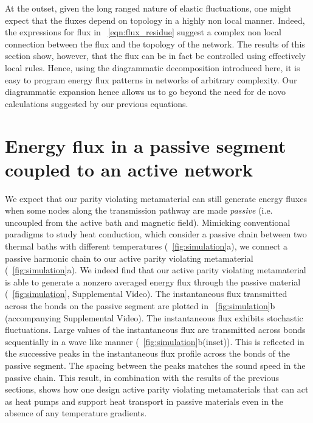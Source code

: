 \documentclass[
 preprint,
 preprintnumbers,
 amsmath,amssymb,
 aps,
 pre,
 longbibliography,
 superscriptaddress,
 10pt, twocolumn
]{revtex4-1}
\begin{document}
At the outset, given the long ranged nature of elastic fluctuations, one might expect that the fluxes depend on topology in a highly non local manner. Indeed, the expressions for flux in \eqnname~\ref{eqn:flux_residue} suggest a complex non local connection between the flux and the topology of the network. The results of this section show, however, that the flux can be in fact be controlled using effectively local rules. Hence, using the diagrammatic decomposition introduced here, it is easy to program energy flux patterns in networks of arbitrary complexity. Our diagrammatic expansion hence allows us to go beyond the need for de novo calculations suggested by our previous equations.

\section{Energy flux in a passive segment coupled to an active network} \label{sec:passive}
\label{sec:passiveflux}
We expect that our parity violating metamaterial can still generate energy fluxes when some nodes along the transmission pathway are made {\it passive} (i.e. uncoupled from the active bath and magnetic field).
Mimicking conventional paradigms to study heat conduction, which consider a passive chain between two thermal baths with different temperatures (\figurename~\ref{fig:simulation}a), we connect a passive harmonic chain to our active parity violating metamaterial (\figurename~\ref{fig:simulation}a).
We indeed find that our active parity violating metamaterial is able to generate a nonzero averaged energy flux through the passive material (\figurename~\ref{fig:simulation}, Supplemental Video). The instantaneous flux transmitted across the bonds on the passive segment are plotted in \figurename~\ref{fig:simulation}b (accompanying Supplemental Video). The instantaneous flux exhibits stochastic fluctuations. Large values of the instantaneous flux are transmitted across bonds sequentially in a wave like manner (\figurename~\ref{fig:simulation}b(inset)). This is reflected in the successive peaks in the instantaneous flux profile across the bonds of the passive segment.  The spacing between the peaks matches the sound speed in the passive chain. This result, in combination with the results of the previous sections, shows how one design active parity violating metamaterials that can act as heat pumps and support heat transport in passive materials even in the absence of any temperature gradients. 
\end{document}

